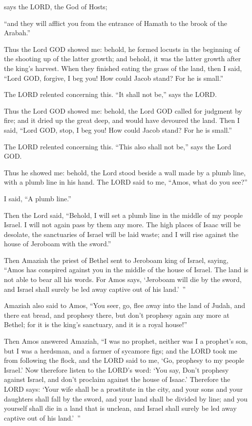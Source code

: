 	says the LORD, the God of Hosts;
	
	“and they will afflict you from the entrance of Hamath to the brook of the Arabah.”
	
	\mychapter{} \myverse*{}Thus the Lord GOD showed me: behold, he formed locusts in the beginning
	of the shooting up of the latter growth; and behold, it was the latter growth after the king’s harvest.
	\myverse{}When they finished eating the grass of the land, then I said, “Lord GOD, forgive,
	I beg you! How could Jacob stand? For he is small.”
	
	\myverse{}The LORD relented concerning this. “It shall not be,” says the
	LORD.
	
	\myverse{}Thus the Lord GOD showed me: behold, the Lord GOD called for judgment
	by fire; and it dried up the great deep, and would have devoured the land.
	\myverse{}Then I said, “Lord GOD, stop, I beg you! How could Jacob stand? For he is small.”
	
	\myverse{}The LORD relented concerning this. “This also shall not be,” says
	the Lord GOD.
	
	\myverse{}Thus he showed me: behold, the Lord stood beside a wall made by
	a plumb line, with a plumb line in his hand.
	\myverse{}The LORD said to me, “Amos, what do you see?”
	
	I said, “A plumb line.”
	
	Then the Lord said, “Behold, I will set a plumb line in the middle of my people Israel. I
	will not again pass by them any more.
	\myverse{}The high places of Isaac will be desolate, the sanctuaries of Israel will be
	laid waste; and I will rise against the house of Jeroboam with the sword.”
	
	\myverse{}Then Amaziah the priest of Bethel sent to Jeroboam king of Israel,
	saying, “Amos has conspired against you in the middle of the house of Israel. The land is not able to
	bear all his words.
	\myverse{}For Amos says, ‘Jeroboam will die by the sword, and Israel shall surely be
	led away captive out of his land.’ ”
	
	\myverse{}Amaziah also said to Amos, “You seer, go, flee away into the
	land of Judah, and there eat bread, and prophesy there,
	\myverse{}but don’t prophesy again any more at Bethel; for it is the king’s sanctuary,
	and it is a royal house!”
	
	\myverse{}Then Amos answered Amaziah, “I was no prophet, neither was I
	a prophet’s son, but I was a herdsman, and a farmer of sycamore figs;
	\myverse{}and the LORD took me from following the flock, and the LORD said to me, ‘Go,
	prophesy to my people Israel.’
	\myverse{}Now therefore listen to the LORD’s word: ‘You say, Don’t prophesy against
	Israel, and don’t proclaim against the house of Isaac.’
	\myverse{}Therefore the LORD says: ‘Your wife shall be a prostitute in the city, and
	your sons and your daughters shall fall by the sword, and your land shall be divided by line; and you
	yourself shall die in a land that is unclean, and Israel shall surely be led away captive out of his land.’ ”
	
